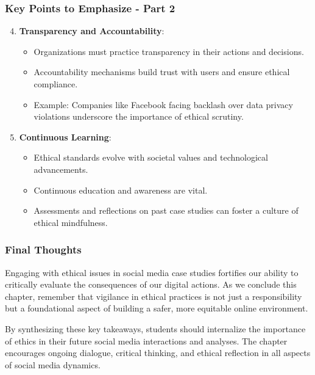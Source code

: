 \documentclass{beamer}
\begin{document}
\begin{frame}[fragile]
    \frametitle{Key Points to Emphasize - Part 2}
    \begin{enumerate}
        \setcounter{enumi}{3}
        \item \textbf{Transparency and Accountability}:
            \begin{itemize}
                \item Organizations must practice transparency in their actions and decisions. 
                \item Accountability mechanisms build trust with users and ensure ethical compliance.
                \item Example: Companies like Facebook facing backlash over data privacy violations underscore the importance of ethical scrutiny.
            \end{itemize}
        
        \item \textbf{Continuous Learning}:
            \begin{itemize}
                \item Ethical standards evolve with societal values and technological advancements. 
                \item Continuous education and awareness are vital.
                \item Assessments and reflections on past case studies can foster a culture of ethical mindfulness.
            \end{itemize}
    \end{enumerate}
\end{frame}

\begin{frame}[fragile]
    \frametitle{Final Thoughts}
    Engaging with ethical issues in social media case studies fortifies our ability to critically evaluate the consequences of our digital actions. As we conclude this chapter, remember that vigilance in ethical practices is not just a responsibility but a foundational aspect of building a safer, more equitable online environment.

    By synthesizing these key takeaways, students should internalize the importance of ethics in their future social media interactions and analyses. The chapter encourages ongoing dialogue, critical thinking, and ethical reflection in all aspects of social media dynamics.
\end{frame}
\end{document}
